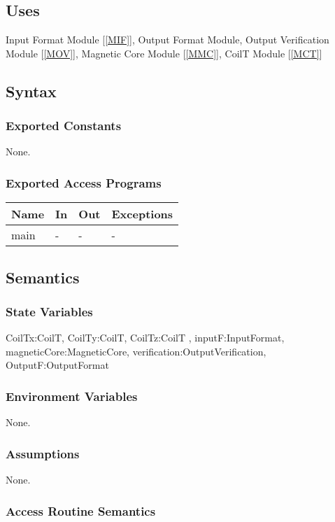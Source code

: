 \documentclass[12pt, titlepage]{article}
\begin{document}
\subsection{Uses}
Input Format Module [\ref{MIF}], Output Format Module, Output Verification Module [\ref{MOV}], Magnetic Core Module [\ref{MMC}], CoilT Module [\ref{MCT}]

\subsection{Syntax}

\subsubsection{Exported Constants}
None.
\subsubsection{Exported Access Programs}

\begin{center}
\begin{tabular}{p{6cm} p{4cm} p{3cm} p{2cm}}
\hline
\textbf{Name} & \textbf{In} & \textbf{Out} & \textbf{Exceptions} \\
\hline
main  & - & - & - \\
\hline
\end{tabular}
\end{center}

\subsection{Semantics}

\subsubsection{State Variables}
CoilTx:CoilT,  CoilTy:CoilT,  CoilTz:CoilT , inputF:InputFormat, magneticCore:MagneticCore, verification:OutputVerification, OutputF:OutputFormat
\subsubsection{Environment Variables}
None.
\subsubsection{Assumptions}
None.

\subsubsection{Access Routine Semantics}
\end{document}

